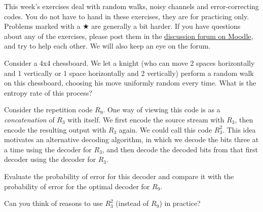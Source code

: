 \documentclass[a4paper,10pt,landscape,twocolumn]{scrartcl}
\begin{document}
\practiceproblems

{\sffamily\noindent
This week's exercises deal with random walks, noisy channels and error-correcting codes. You do not have to hand in these exercises, they are for practicing only. Problems marked with a $\bigstar$ are generally a bit harder. If you have questions about any of the exercises, please post them in the \href{https://www.moodle.ch/lms/mod/forum/view.php?id=1761}{discussion forum on Moodle}, and try to help each other. We will also keep an eye on the forum.
}

\begin{exercise}
Consider a 4x4 chessboard. We let a knight (who can move 2 spaces horizontally and 1 vertically or 1 space horizontally and 2 vertically) perform a random walk on this chessboard, choosing his move uniformly random every time. What is the entropy rate of this process?
\end{exercise}

\begin{exercise}
Consider the repetition code $R_9$. One way of viewing this code is as a \emph{concatenation} of $R_3$ with itself. We first encode the source stream with $R_3$, then encode the resulting output with $R_3$ again. We could call this code $R_3^2$. This idea motivates an alternative decoding algorithm, in which we decode the bits three at a time using the decoder for $R_3$, and then decode the decoded bits from that first decoder using the decoder for $R_3$.

Evaluate the probability of error for this decoder and compare it with the probability of error for the optimal decoder for $R_9$.

Can you think of reasons to use $R_3^2$ (instead of $R_9$) in practice?
\end{exercise}
\end{document}
